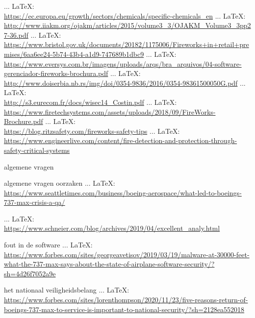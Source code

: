 \begin{thebibliography}{99}
{{{{{{{	 ... \LaTeX:\\ \url{https://ec.europa.eu/growth/sectors/chemicals/specific-chemicals_en}
	 ... \LaTeX:\\ \url{http://www.iiakm.org/ojakm/articles/2015/volume3_3/OJAKM_Volume3_3pp27-36.pdf}
	 ... \LaTeX:\\ \url{https://www.bristol.gov.uk/documents/20182/1175006/Fireworks+in+retail+premises/6aa6ee24-5b74-43b4-a1d9-747689b1dbc9}
	 ... \LaTeX:\\ \url{https://www.eversys.com.br/imagens/uploads/arqs/bra_arquivos/04-software-gerenciador-fireworks-brochura.pdf}
	 ... \LaTeX:\\ \url{http://www.doiserbia.nb.rs/img/doi/0354-9836/2016/0354-98361500050G.pdf}
	 ... \LaTeX:\\ \url{http://s3.eurecom.fr/docs/wisec14_Costin.pdf}
	 ... \LaTeX:\\ \url{https://www.firetechsystems.com/assets/uploads/2018/09/FireWorks-Brochure.pdf}
	 ... \LaTeX:\\ \url{https://blog.ritzsafety.com/fireworks-safety-tips}
	 ... \LaTeX:\\ \url{https://www.engineerlive.com/content/fire-detection-and-protection-through-safety-critical-systems}
    
    algemene vragen
    
    algemene vragen
    oorzaken
     ... \LaTeX:\\ \url{https://www.seattletimes.com/business/boeing-aerospace/what-led-to-boeings-737-max-crisis-a-qa/}
    
     ... \LaTeX:\\ \url{https://www.schneier.com/blog/archives/2019/04/excellent_analy.html}
    
    fout in de software
     ... \LaTeX:\\ \url{https://www.forbes.com/sites/georgeavetisov/2019/03/19/malware-at-30000-feet-what-the-737-max-says-about-the-state-of-airplane-software-security/?sh=4d26f7052a9e}
    
    het nationaal veiligheidsbelang
     ... \LaTeX:\\ \url{https://www.forbes.com/sites/lorenthompson/2020/11/23/five-reasons-return-of-boeings-737-max-to-service-is-important-to-national-security/?sh=2128ea552018}
    
}}}}}}}
\end{thebibliography}
